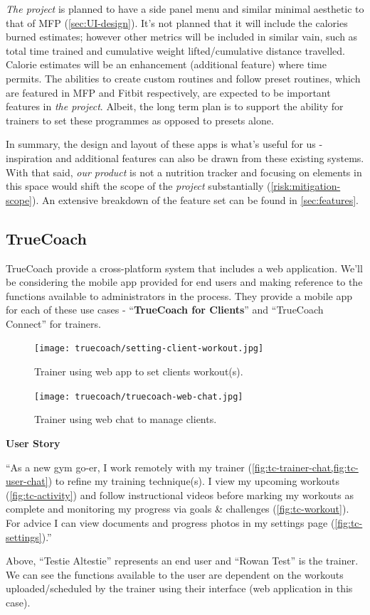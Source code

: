 \textit{The project} is planned to have a side panel 
menu and similar minimal aesthetic to that of MFP (\cref{sec:UI-design}).
It's not planned that it will include the calories burned estimates; however other metrics will be included in similar vain, such
as total time trained and cumulative weight lifted/cumulative distance travelled. Calorie estimates will be an enhancement (additional feature) where time permits.
The abilities to create custom routines and follow preset routines, which are featured in MFP and Fitbit respectively,
are expected to be important features in \textit{the project}. Albeit, the long term plan
is to support the ability for trainers to set these programmes as opposed to presets alone. 
\par
In summary, the design
and layout of these apps is what's useful for us - inspiration and additional features can also be drawn
from these existing systems. With that said, \textit{our product} is not a nutrition tracker and focusing
on elements in this space would shift the scope of the \textit{project} substantially (\cref{risk:mitigation-scope}). An extensive
breakdown of the feature set can be found in \cref{sec:features}.
\pagebreak
\subsection{TrueCoach}
TrueCoach provide a cross-platform system that includes a web application.
We'll be considering the mobile app provided for end users and making reference
to the functions available to administrators in the process. They provide a mobile app
for each of these use cases - ``\textbf{TrueCoach for Clients}'' and ``TrueCoach Connect'' for trainers.
\begin{figure}[H]
	\centering
	\texttt{[image: truecoach/setting-client-workout.jpg]}
	\caption{Trainer using web app to set clients workout(s).}
	\vspace*{-5mm}
	\label{fig:tc-trainer-set}
\end{figure}
\begin{figure}[H]
	\centering
	\texttt{[image: truecoach/truecoach-web-chat.jpg]}
	\caption{Trainer using web chat to manage clients.}
	\vspace*{-5mm}
	\label{fig:tc-trainer-chat}
\end{figure}
\textbf{User Story}
\label{research-breakdown:tc-usr-story}
\par
``As a new gym go-er, I work remotely with my trainer (\cref{fig:tc-trainer-chat,fig:tc-user-chat}) to refine my training technique(s).
I view my upcoming workouts (\cref{fig:tc-activity}) and follow instructional videos before marking my workouts as complete and monitoring 
my progress via goals \& challenges (\cref{fig:tc-workout}). For advice I can view
documents and progress photos in my settings page (\cref{fig:tc-settings}).''

\vspace*{-5mm}

Above, ``Testie Altestie'' represents an end user and ``Rowan Test'' is the trainer. We can see
the functions available to the user are dependent on the workouts uploaded/scheduled
by the trainer using their interface (web application in this case).
\pagebreak

